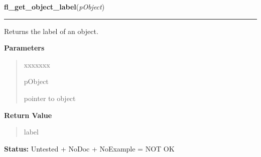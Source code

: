 \hspace{.8\funcindent}\begin{boxedminipage}{\funcwidth}

    \raggedright \textbf{fl\_get\_object\_label}(\textit{pObject})

    \vspace{-1.5ex}

    \rule{\textwidth}{0.5\fboxrule}
\setlength{\parskip}{2ex}
    Returns the label of an object.

\setlength{\parskip}{1ex}
      \textbf{Parameters}
      \vspace{-1ex}

      \begin{quote}
        \begin{Ventry}{xxxxxxx}

          \item[pObject]

          pointer to object

        \end{Ventry}

      \end{quote}

      \textbf{Return Value}
    \vspace{-1ex}

      \begin{quote}
      label

      \end{quote}

\textbf{Status:} Untested + NoDoc + NoExample = NOT OK



    \end{boxedminipage}

    \label{xformslib:library:fl_set_object_helper}

    \vspace{0.5ex}

